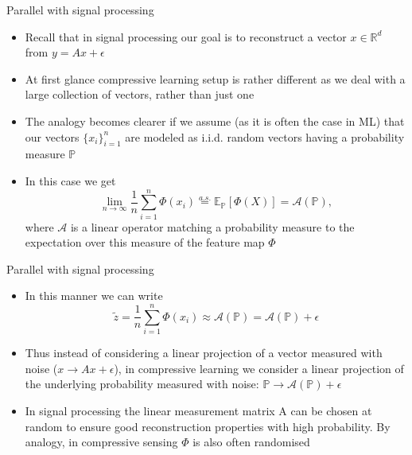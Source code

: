 
\begin{frame}{Parallel with signal processing}
		
		\begin{itemize}
			\item Recall that in signal processing our goal is to reconstruct a vector $x \in \mathbb{R}^{d}$ from $y = Ax + \epsilon$
			\item At first glance compressive learning setup is rather different as we deal with a large collection of vectors, rather than just one
			\item The analogy becomes clearer if we assume (as it is often the case in ML) that our vectors {$\{x_{i}\}_{i = 1}^{n}$} are modeled as i.i.d. random vectors having a probability measure $\mathbb{P}$
			
			\item In this case we get
			$$
			\lim _{n \rightarrow \infty} \frac{1}{n} \sum_{i=1}^{n} \Phi\left(x_{i}\right) \stackrel{a.s.}{=} \mathbb{E_{\mathbb{P}}}[\Phi(X)] = \mathcal{A}(\mathbb{P}),
			$$
			where $\mathcal{A}$ is a linear operator matching a probability measure to the expectation over this measure of the feature map $\Phi$
		\end{itemize}
	\end{frame}
	
	\begin{frame}{Parallel with signal processing}
		\begin{itemize}
			\item In this manner we can write
			$$
			\tilde{z} =  \frac{1}{n} \sum_{i=1}^{n} \Phi(x_{i}) \approx \mathcal{A}(\mathbb{P}) = \mathcal{A}(\mathbb{P}) + \epsilon
			$$
			\item Thus instead of considering a linear projection of a vector measured with noise ($x \rightarrow Ax + \epsilon$), in compressive learning we consider a linear projection of the underlying probability measured with noise: $\mathbb{P} \rightarrow \mathcal{A}(\mathbb{P}) + \epsilon$
			
			\item In signal processing the linear measurement matrix A can be chosen at random to ensure good reconstruction properties with high probability. By analogy, in compressive sensing $\Phi$ is also often randomised
		\end{itemize}
	\end{frame}

